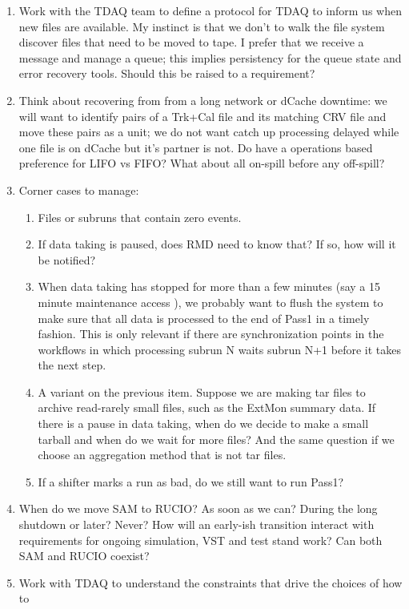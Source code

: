 \begin{enumerate}
\item Work with the TDAQ team to define a protocol for TDAQ to inform us when new files are available.
  My instinct is that we don't to walk the file system discover files that need to be moved to tape.
  I prefer that we receive a message and manage a queue; this implies persistency for the queue state
  and error recovery tools.
  Should this be raised to a requirement?
\item
  Think about recovering from from a long network or dCache downtime:
  we will want to identify pairs of a Trk+Cal file and its matching CRV file and move these pairs as a unit;
  we do not want catch up processing delayed while one file is on dCache but it's partner is not.
  Do have a operations based preference for LIFO vs FIFO? What about all on-spill before any off-spill?
\item Corner cases to manage:
  \begin{enumerate}
    \item Files or subruns that contain zero events.
    \item If data taking is paused, does RMD need to know that?  If so, how will it be notified?
    \item When data taking has stopped for more than a few minutes (say a 15 minute maintenance access ),
      we probably want to flush the system to make sure that all data is processed to the end of Pass1
      in a timely fashion.
      This is only relevant if there are synchronization points in the workflows in which processing
      subrun N waits subrun N+1 before it takes the next step.
    \item A variant on the previous item.  Suppose we are making tar files to archive read-rarely small
      files, such as the ExtMon summary data.
      If there is a pause in data taking, when do we decide to make a small tarball and when
      do we wait for more files?  And the same question if we choose an aggregation method that is not
      tar files.
    \item If a shifter marks a run as bad, do we still want to run Pass1?
  \end{enumerate}
\item   When do we move SAM to RUCIO? As soon as we can? During the long shutdown or later?  Never?
  How will an early-ish transition interact with requirements for ongoing simulation, VST and test stand work?
  Can both SAM and RUCIO coexist?
\item Work with TDAQ to understand the constraints that drive the choices of how to

\end{enumerate}
